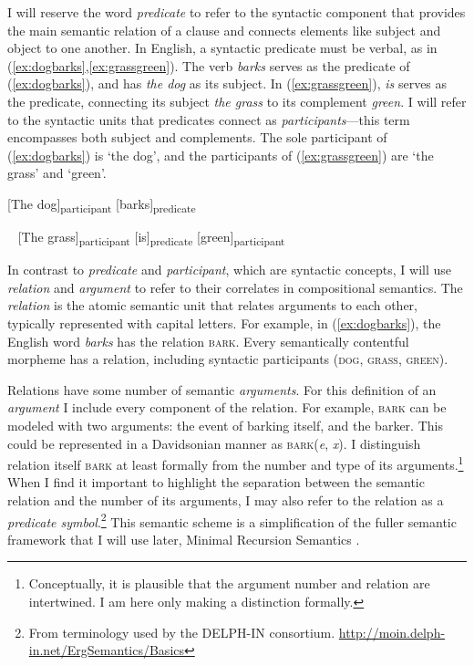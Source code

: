 I will reserve the word \textit{predicate} to refer to the syntactic component that provides the main semantic relation of a clause and connects elements like subject and object to one another. In English, a syntactic predicate must be verbal, as in (\ref{ex:dogbarks},\ref{ex:grassgreen}). The verb \textit{barks} serves as the predicate of (\ref{ex:dogbarks}), and has \textit{the dog} as its subject. In (\ref{ex:grassgreen}), \textit{is} serves as the predicate, connecting its subject \textit{the grass} to its complement \textit{green}. I will refer to the syntactic units that predicates connect as \textit{participants}---this term encompasses both subject and complements. The sole participant of (\ref{ex:dogbarks}) is `the dog', and the participants of (\ref{ex:grassgreen}) are `the grass' and `green'.

\ex \label{ex:dogbarks}
[The dog]\textsubscript{participant} [barks]\textsubscript{predicate}
\xe

\ex~ \label{ex:grassgreen}
[The grass]\textsubscript{participant} [is]\textsubscript{predicate} [green]\textsubscript{participant}
\xe

In contrast to \textit{predicate} and \textit{participant}, which are syntactic concepts, I will use \textit{relation} and \textit{argument} to refer to their correlates in compositional semantics. The \textit{relation} is the atomic semantic unit that relates arguments to each other, typically represented with capital letters. For example, in (\ref{ex:dogbarks}), the English word \textit{barks} has the relation \textsc{bark}. Every semantically contentful morpheme has a relation, including syntactic participants (\textsc{dog}, \textsc{grass}, \textsc{green}).

Relations have some number of semantic \textit{arguments}. For this definition of an \textit{argument} I include every component of the relation. For example, \textsc{bark} can be modeled with two arguments: the event of barking itself, and the barker. This could be represented in a Davidsonian manner \citep{davidson1967} as \textsc{bark}(\textit{e}, \textit{x}). I distinguish relation itself \textsc{bark} at least formally from the number and type of its arguments.\footnote{Conceptually, it is plausible that the argument number and relation are intertwined. I am here only making a distinction formally.} When I find it important to highlight the separation between the semantic relation and the number of its arguments, I may also refer to the relation as a \textit{predicate symbol}.\footnote{From terminology used by the DELPH-IN consortium. \url{http://moin.delph-in.net/ErgSemantics/Basics}} This semantic scheme is a simplification of the fuller semantic framework that I will use later, Minimal Recursion Semantics \citep{copestake2005}.

